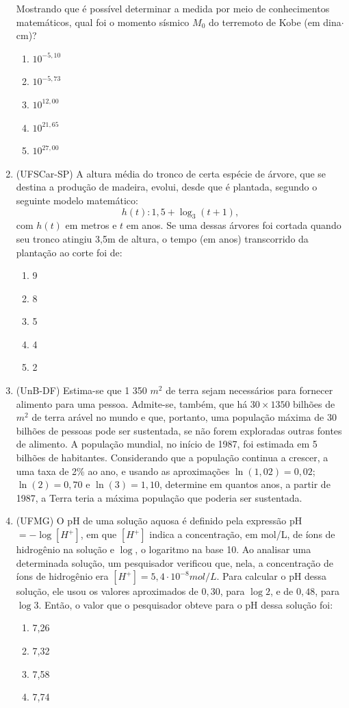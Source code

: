 \begin{enumerate}
Mostrando que é possível determinar a medida por meio de conhecimentos matemáticos, qual foi o momento sísmico $M_0$ do 
terremoto de Kobe (em dina$\cdot$cm)?

\begin{enumerate}
    \item $10^{-5,10}$
    \item $10^{-5,73}$
    \item $10^{12,00}$
    \item $10^{21,65}$
    \item $10^{27,00}$
\end{enumerate}

\clearpage
\item \label{Exer9} (UFSCar-SP) A altura média do tronco de certa espécie de árvore, que se destina a produção de madeira, evolui, 
desde que é plantada, segundo o seguinte modelo matemático:
$$
h(t): 1,5 + \log_3 (t+1),
$$ com $h(t)$ em metros e $t$ em anos. 
Se uma dessas árvores foi cortada quando seu tronco atingiu 3,5m de altura, o tempo (em anos) transcorrido da 
plantação 
ao corte foi de:
\begin{enumerate}
    \item 9
    \item 8
    \item 5
    \item 4
    \item 2
\end{enumerate}


\item \label{Exer10} (UnB-DF) Estima-se que 1 350 $m^2$ de terra sejam necessários para fornecer alimento para uma pessoa. Admite-se, 
também, que há $30 \times 1 350$ bilhões de $m^2$ de terra arável no mundo e que, portanto, uma população máxima de 30 
bilhões de pessoas pode ser sustentada, se não forem exploradas outras fontes de alimento. A população mundial, no 
início de 1987, foi estimada em 5 bilhões de habitantes. Considerando que a população continua a crescer, a uma taxa de 
2{\%} ao ano, e usando as aproximações $\ln(1{,}02) = 0{,}02$;  $\ln(2) = 0{,}70$ e  $\ln(3) = 1{,}10$, determine em quantos anos, 
a partir de 1987, a Terra teria a máxima população que poderia ser sustentada.




\item \label{Exer11} (UFMG) O pH de uma solução aquosa é definido pela expressão pH $= -\log [H^+]$, em que $[H^+]$ indica a concentração, em 
mol/L, de íons de hidrogênio na solução e $\log$, o logaritmo na base 10.
Ao analisar uma determinada solução, um pesquisador verificou que, nela, a concentração de íons de hidrogênio era $[H^+] 
= 5,4\cdot 10^{-8} mol/L$. Para calcular o pH dessa solução, ele usou os valores aproximados de $0{,}30$, para $\log 2$, e de $0{,}48$, para  $\log 3$.
Então, o valor que o pesquisador obteve para o pH dessa solução foi:
\begin{enumerate}
    \item  7,26 
    \item 7,32 
    \item  7,58
    \item 7,74
\end{enumerate}


\end{enumerate}
